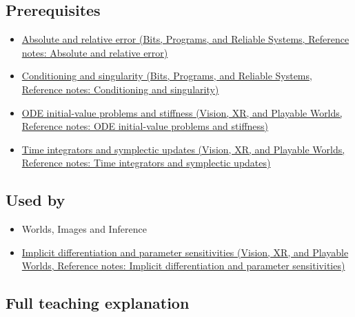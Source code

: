 \subsection{Prerequisites}\label{appendix-18eacf61a04b-prerequisites}

\hypertarget{appendix-18eacf61a04b-prerequisites}{}

\begin{itemize}
\tightlist
\item
  \href{../01-Bits-Programs-and-Reliable-Systems/main.pdf\#nameddest=appendix-3ae74e89b4e6}{Absolute and relative error (Bits, Programs, and Reliable Systems, Reference notes: Absolute and relative error)}
\item
  \href{../01-Bits-Programs-and-Reliable-Systems/main.pdf\#nameddest=appendix-8f6a01f284a7}{Conditioning and singularity (Bits, Programs, and Reliable Systems, Reference notes: Conditioning and singularity)}
\item
  \href{../07-Vision-XR-and-Playable-Worlds/main.pdf\#nameddest=appendix-e8ab9836882e}{ODE initial-value problems and stiffness (Vision, XR, and Playable Worlds, Reference notes: ODE initial-value problems and stiffness)}
\item
  \href{../07-Vision-XR-and-Playable-Worlds/main.pdf\#nameddest=appendix-8f96f9c4d5bc}{Time integrators and symplectic updates (Vision, XR, and Playable Worlds, Reference notes: Time integrators and symplectic updates)}
\end{itemize}

\subsection{Used by}\label{appendix-18eacf61a04b-used-by}

\hypertarget{appendix-18eacf61a04b-used-by}{}

\begin{itemize}
\tightlist
\item
  {Worlds, Images and Inference}
\item
  \href{../07-Vision-XR-and-Playable-Worlds/main.pdf\#nameddest=appendix-8836553d56fc}{Implicit differentiation and parameter sensitivities (Vision, XR, and Playable Worlds, Reference notes: Implicit differentiation and parameter sensitivities)}
\end{itemize}

\subsection{Full teaching explanation}\label{appendix-18eacf61a04b-full-teaching-explanation}

